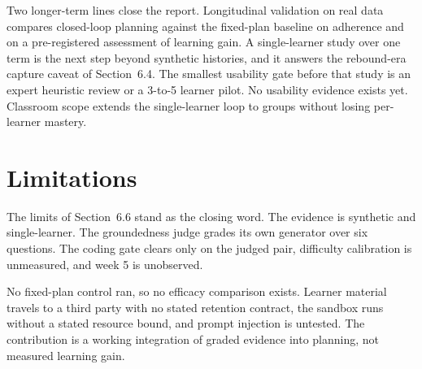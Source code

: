Two longer-term lines close the report. Longitudinal validation on real data compares closed-loop planning against the fixed-plan baseline on adherence and on a pre-registered assessment of learning gain. A single-learner study over one term is the next step beyond synthetic histories, and it answers the rebound-era capture caveat of Section~6.4. The smallest usability gate before that study is an expert heuristic review or a 3-to-5 learner pilot. No usability evidence exists yet. Classroom scope extends the single-learner loop to groups without losing per-learner mastery.

\section{Limitations}
The limits of Section~6.6 stand as the closing word. The evidence is synthetic and single-learner. The groundedness judge grades its own generator over six questions. The coding gate clears only on the judged pair, difficulty calibration is unmeasured, and week 5 is unobserved.

No fixed-plan control ran, so no efficacy comparison exists. Learner material travels to a third party with no stated retention contract, the sandbox runs without a stated resource bound, and prompt injection is untested. The contribution is a working integration of graded evidence into planning, not measured learning gain.
